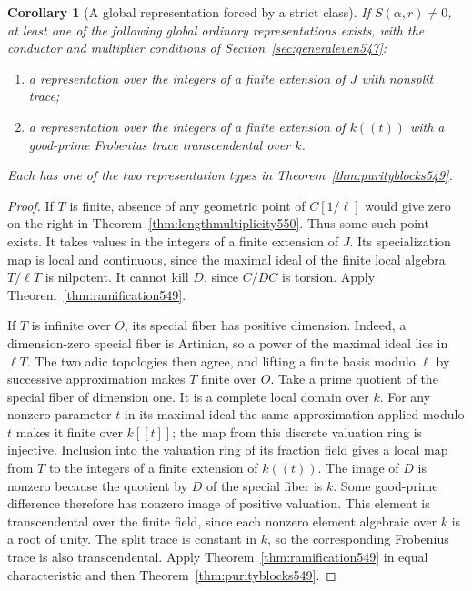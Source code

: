 \documentclass[a4paper,11pt]{article}
\newtheorem{corollary}[proposition]{Corollary}
\theoremstyle{definition}
\theoremstyle{remark}
\numberwithin{equation}{section}
\begin{document}
\begin{corollary}[A global representation forced by a strict class]
\leavevmode\label{cor:pointalternative550}
If \(S(\alpha,r)\ne0\), at least one of the following global
ordinary representations exists, with the conductor and multiplier
conditions of Section~\ref{sec:generaleven547}:
\begin{enumerate}
\item a representation over the integers of a finite extension of
\(J\) with nonsplit trace;
\item a representation over the integers of a finite extension of
\(k((t))\) with a good-prime Frobenius trace transcendental over \(k\).
\end{enumerate}
Each has one of the two representation types in
Theorem~\ref{thm:purityblocks549}.
\end{corollary}
\begin{proof}
If \(T\) is finite, absence of any geometric point of \(C[1/\ell]\)
would give zero on the right in
Theorem~\ref{thm:lengthmultiplicity550}. Thus some such point
exists. It takes values in the integers of a finite extension
of \(J\). Its specialization map is local and continuous,
since the maximal ideal of the finite local algebra \(T/\ell T\)
is nilpotent. It cannot kill \(D\), since \(C/DC\) is torsion.
Apply Theorem~\ref{thm:ramification549}.

If \(T\) is infinite over \(O\), its special fiber has positive
dimension. Indeed, a dimension-zero special fiber is Artinian,
so a power of the maximal ideal lies in \(\ell T\). The two adic
topologies then agree, and lifting a finite basis modulo \(\ell\)
by successive approximation makes \(T\) finite over \(O\).
Take a prime quotient of the special fiber of dimension one.
It is a complete local domain over \(k\). For any nonzero
parameter \(t\) in its maximal ideal the same approximation
applied modulo \(t\) makes it finite over \(k[[t]]\); the map
from this discrete valuation ring is injective. Inclusion into
the valuation ring of its fraction field gives a local map from
\(T\) to the integers of a finite extension of \(k((t))\). The
image of \(D\) is nonzero because the quotient by \(D\) of the
special fiber is \(k\). Some good-prime difference therefore
has nonzero image of positive valuation. This element is
transcendental over the finite field, since each nonzero element
algebraic over \(k\) is a root of unity. The split trace is
constant in \(k\), so the corresponding Frobenius trace is also
transcendental. Apply Theorem~\ref{thm:ramification549} in equal
characteristic and then Theorem~\ref{thm:purityblocks549}.
\end{proof}
\end{document}
